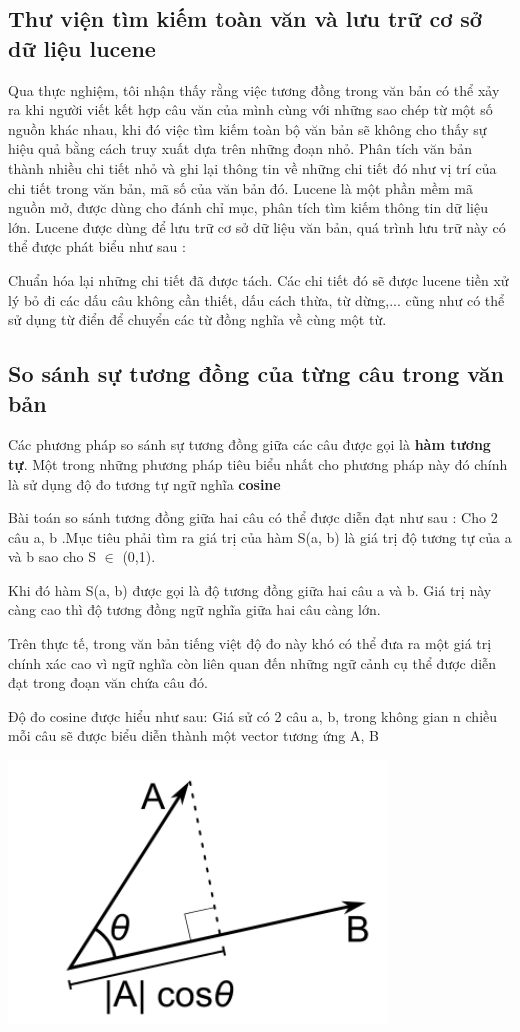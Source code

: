 \documentclass[12pt]{report}
\begin{document}
\subsection{Thư viện tìm kiếm toàn văn và lưu trữ cơ sở dữ liệu lucene}

Qua thực nghiệm, tôi nhận thấy rằng việc tương đồng trong văn bản có thể xảy ra khi người viết kết hợp câu văn của mình cùng với những sao chép từ một số nguồn khác nhau, khi đó việc tìm kiếm toàn bộ văn bản sẽ không cho thấy sự hiệu quả bằng cách truy xuất dựa trên những đoạn nhỏ. Phân tích văn bản thành nhiều chi tiết nhỏ và ghi lại thông tin về những chi tiết đó như vị trí của chi tiết trong văn bản, mã số của văn bản đó. Lucene là một phần mềm mã nguồn mở, được dùng cho đánh chỉ mục, phân tích tìm kiếm thông tin dữ liệu lớn. Lucene được dùng để lưu trữ cơ sở dữ liệu văn bản, quá trình lưu trữ này có thể được phát biểu như sau :
	
Chuẩn hóa lại những chi tiết đã được tách. Các chi tiết đó sẽ được lucene tiền xử lý bỏ đi các dấu câu không cần thiết, dấu cách thừa, từ dừng,... cũng  như có thể sử dụng từ điển để chuyển các từ đồng nghĩa về cùng một từ.

\subsection{So sánh sự tương đồng của từng câu trong văn bản}
Các phương pháp so sánh sự tương đồng giữa các câu được gọi là \textbf{hàm tương tự}. Một trong những phương pháp tiêu biểu nhất cho phương pháp này đó chính là sử dụng độ đo tương tự ngữ nghĩa \textbf{cosine}

Bài toán so sánh tương đồng giữa hai câu có thể được diễn đạt như sau : 
Cho 2 câu a, b .Mục tiêu phải tìm ra giá trị của hàm S(a, b) là giá trị độ tương tự của a và b sao cho S $\in$ (0,1). 

Khi đó hàm S(a, b) được gọi là độ tương đồng giữa hai câu a và b. Giá trị này càng cao thì độ tương đồng ngữ nghĩa giữa hai câu càng lớn. 

Trên thực tế, trong văn bản tiếng việt độ đo này khó có thể đưa ra một giá trị chính xác cao vì ngữ nghĩa còn liên quan đến những ngữ cảnh cụ thể được diễn đạt trong đoạn văn chứa câu đó.

Độ đo cosine được hiểu như sau:
Giá sử có 2 câu a, b, trong không gian n chiều mỗi câu sẽ được biểu diễn thành một vector tương ứng A, B
\begin{center}
	\includegraphics[width=0.4\linewidth]{cosine}	
\end{center}
\end{document}
